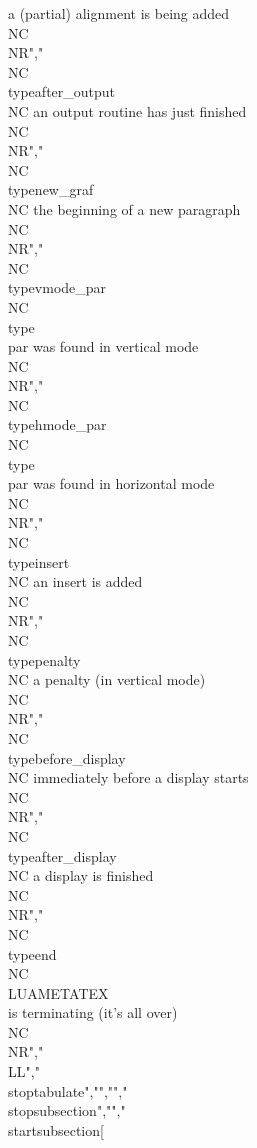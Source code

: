 a (partial) alignment is being added        \\NC \\NR","\\NC \\type{after_output}   \\NC an output routine has just finished         \\NC \\NR","\\NC \\type{new_graf}       \\NC the beginning of a new paragraph            \\NC \\NR","\\NC \\type{vmode_par}      \\NC \\type {\\par} was found in vertical mode     \\NC \\NR","\\NC \\type{hmode_par}      \\NC \\type {\\par} was found in horizontal mode   \\NC \\NR","\\NC \\type{insert}         \\NC an insert is added                          \\NC \\NR","\\NC \\type{penalty}        \\NC a penalty (in vertical mode)                \\NC \\NR","\\NC \\type{before_display} \\NC immediately before a display starts         \\NC \\NR","\\NC \\type{after_display}  \\NC a display is finished                       \\NC \\NR","\\NC \\type{end}            \\NC \\LUAMETATEX\\ is terminating (it's all over) \\NC \\NR","\\LL","\\stoptabulate","","","\\stopsubsection","","\\startsubsection[